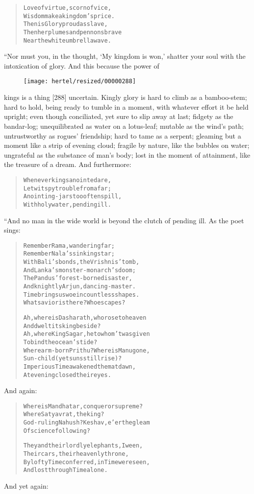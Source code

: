 \documentclass[article, twoside, 10pt]{memoir}
\renewenvironment{verbatim}{%
\begin{quote}%
\vskip -10pt%
\begin{alltt}\normalfont\small}{\end{alltt}%
\end{quote}%
\vskip -10pt
} %
\begin{document}
\begin{verbatim}
Love of virtue, scorn of vice,
Wisdom{\textemdash}make a kingdom's price.
Then is Glory proud as slave,
Then her plumes and pennons brave
Near the white umbrella wave.
\end{verbatim}
“Nor must you, in the thought, `My kingdom is won,' shatter your
soul with the intoxication of glory. And this because the power of
\begin{figure}[p]\texttt{[image: hertel/resized/00000288]}\end{figure}kings is a thing [288] uncertain. Kingly glory is hard to climb as
a bamboo-stem; hard to hold, being ready to tumble in a moment,
with whatever effort it be held upright; even though conciliated,
yet sure to slip away at last; fidgety as the bandar-log;
unequilibrated as water on a lotus-leaf; mutable as the wind's
path; untrustworthy as rogues' friendship; hard to tame as a
serpent; gleaming but a moment like a strip of evening cloud;
fragile by nature, like the bubbles on water; ungrateful as the
substance of man's body; lost in the moment of attainment, like the
treasure of a dream. And furthermore:

\begin{verbatim}
Whenever kings anointed are,
Let wit spy trouble from afar;
Anointing-jars too often spill,
With holy water, pending ill.
\end{verbatim}
“And no man in the wide world is beyond the clutch of pending ill.
As the poet sings:

\begin{verbatim}
Remember Rama, wandering far;
Remember Nala's sinking star;
With Bali's bonds, the Vrishnis' tomb,
And Lanka's monster-monarch's doom;
The Pandus' forest-borne disaster,
And knightly Arjun, dancing-master.
Time brings us woe in countless shapes.
What savior is there? Who escapes?

Ah, where is Dasharath, who rose to heaven
    And dwelt its king beside?
Ah, where King Sagar, he to whom 'twas given
    To bind the ocean's tide?
Where arm-born Prithu? Where is Manu gone,
    Sun-child (yet suns still rise)?
Imperious Time awakened them at dawn,
At evening closed their eyes.
\end{verbatim}
And again:

\begin{verbatim}
Where is Mandhatar, conqueror supreme?
    Where Satyavrat, the king?
God-ruling Nahush? Keshav, e'er the gleam
    Of science following?

They and their lordly elephants, I ween,
    Their cars, their heavenly throne,
By lofty Time conferred, in Time were seen,
    And lost through Time alone.
\end{verbatim}
And yet again:
\end{document}
